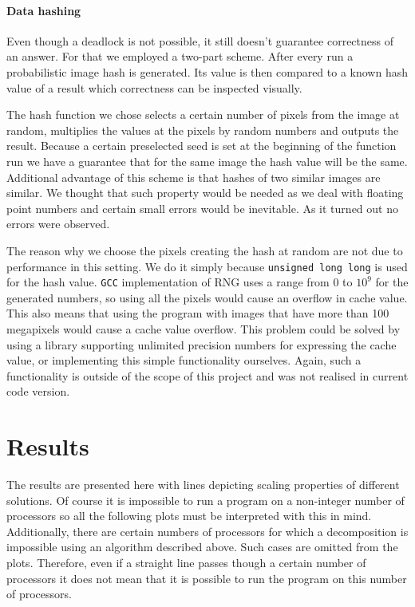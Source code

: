 \documentclass[11pt,a4paper]{article}
\begin{document}
\paragraph{Data hashing}
Even though a deadlock is not possible, it still doesn't guarantee correctness of an answer.
For that we employed a two-part scheme.
After every run a probabilistic image hash is generated.
Its value is then compared to a known hash value of a result which correctness can be inspected visually.

The hash function we chose selects a certain number of pixels from the image at random, multiplies the values at the pixels by random numbers and outputs the result.
Because a certain preselected seed is set at the beginning of the function run we have a guarantee that for the same image the hash value will be the same.
Additional advantage of this scheme is that hashes of two similar images are similar.
We thought that such property would be needed as we deal with floating point numbers and certain small errors would be inevitable.
As it turned out no errors were observed.

The reason why we choose the pixels creating the hash at random are not due to performance in this setting.
We do it simply because \texttt{unsigned long long} is used for the hash value.
\texttt{GCC} implementation of RNG uses a range from $0$ to $10^9$ for the generated numbers, so using all the pixels would cause an overflow in cache value.
This also means that using the program with images that have more than 100 megapixels would cause a cache value overflow.
This problem could be solved by using a library supporting unlimited precision numbers for expressing the cache value, or implementing this simple functionality ourselves.
Again, such a functionality is outside of the scope of this project and was not realised in current code version.

\label{sec:correctness}

\section{Results}
The results are presented here with lines depicting scaling properties of different solutions.
Of course it is impossible to run a program on a non-integer number of processors so all the following plots must be interpreted with this in mind.
Additionally, there are certain numbers of processors for which a decomposition is impossible using an algorithm described above.
Such cases are omitted from the plots.
Therefore, even if a straight line passes though a certain number of processors it does not mean that it is possible to run the program on this number of processors.
\end{document}
